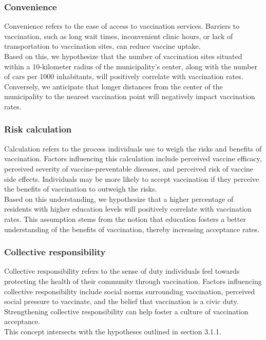 \documentclass[a4paper,12pt]{article} %
\begin{document}
\subsubsection{Convenience}
Convenience refers to the ease of access to vaccination services. Barriers to vaccination, such as long wait times, inconvenient clinic hours, or lack of transportation to vaccination sites, can reduce vaccine uptake. 
\\
Based on this, we hypothesize that the number of vaccination sites situated within a 10-kilometer radius of the municipality's center, along with the number of cars per 1000 inhabitants, will positively correlate with vaccination rates. Conversely, we anticipate that longer distances from the center of the municipality to the nearest vaccination point will negatively impact vaccination rates.

\subsubsection{Risk calculation}
Calculation refers to the process individuals use to weigh the risks and benefits of vaccination. Factors influencing this calculation include perceived vaccine efficacy, perceived severity of vaccine-preventable diseases, and perceived risk of vaccine side effects. Individuals may be more likely to accept vaccination if they perceive the benefits of vaccination to outweigh the risks.
\\
Based on this understanding, we hypothesize that a higher percentage of residents with higher education levels will positively correlate with vaccination rates. This assumption stems from the notion that education fosters a better understanding of the benefits of vaccination, thereby increasing acceptance rates.

\subsubsection{Collective responsibility}
Collective responsibility refers to the sense of duty individuals feel towards protecting the health of their community through vaccination. Factors influencing collective responsibility include social norms surrounding vaccination, perceived social pressure to vaccinate, and the belief that vaccination is a civic duty. Strengthening collective responsibility can help foster a culture of vaccination acceptance.
\\
This concept intersects with the hypotheses outlined in section 3.1.1.
\end{document}
